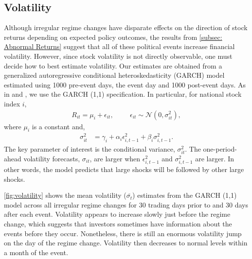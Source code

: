 \documentclass[12pt,final,fleqn]{article}
\theoremstyle{plain}
\begin{document}
\subsection{Volatility} \label{subsec: Volatility}
Although irregular regime changes have disparate effects on the direction of stock returns depending on expected policy outcomes, the results from \autoref{subsec: Abnormal Returns} suggest that all of these political events increase financial volatility. However, since stock volatility is not directly observable, one must decide how to best estimate volatility. Our estimates are obtained from a generalized autoregressive conditional heteroskedasticity (GARCH) model estimated using 1000 pre-event days, the event day and 1000 post-event days. As in \citep{jensen2005market} and \citep{leblang2005government}, we use the GARCH (1,1) specification. In particular, for national stock index $i$,
\begin{align*}
R_{it}=\mu_i + \epsilon_{it},\hspace{1cm} \epsilon_{it}\sim \mathcal{N}\left(0,\sigma_{it}^2\right),
\end{align*}
where $\mu_i$ is a constant and,
\begin{align*}
\sigma_{it}^2&=\gamma_{i}+\alpha_{i}\epsilon_{i,t-1}^2+\beta_{i}\sigma_{i,t-1}^2.
\end{align*}
The key parameter of interest is the conditional variance, $\sigma_{it}^2$. The one-period-ahead volatility forecasts, $\sigma_{it}$, are larger when $\epsilon_{i,t-1}^2$ and $\sigma_{i,t-1}^2$ are larger. In other words, the model predicts that large shocks will be followed by other large shocks.

\autoref{fig:volatility} shows the mean volatility ($\overline{\sigma_t}$) estimates from the GARCH (1,1) model across all irregular regime changes for 30 trading days prior to and 30 days after each event. Volatility appears to increase slowly just before the regime change, which suggests that investors sometimes have information about the events before they occur. Nonetheless, there is still an enormous volatility jump on the day of the regime change. Volatility then decreases to normal levels within a month of the event.
\end{document}
